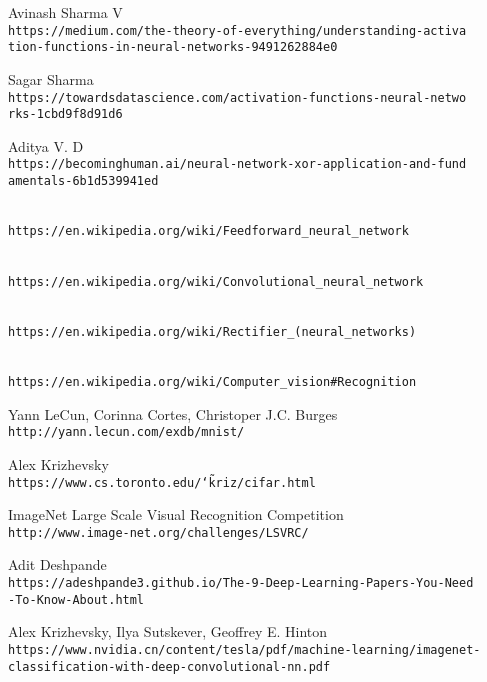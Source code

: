 \begin{thebibliography}{99}
Avinash Sharma V
\\\texttt{https://medium.com/the-theory-of-everything/understanding-activa\\tion-functions-in-neural-networks-9491262884e0}

Sagar Sharma
\\\texttt{https://towardsdatascience.com/activation-functions-neural-netwo\\rks-1cbd9f8d91d6}

Aditya V. D
\\\texttt{https://becominghuman.ai/neural-network-xor-application-and-fund\\amentals-6b1d539941ed}

\\\texttt{https://en.wikipedia.org/wiki/Feedforward\_neural\_network}

\\\texttt{https://en.wikipedia.org/wiki/Convolutional\_neural\_network}

\\\texttt{https://en.wikipedia.org/wiki/Rectifier\_(neural\_networks)}

\\\texttt{https://en.wikipedia.org/wiki/Computer\_vision\#Recognition}

Yann LeCun, Corinna Cortes, Christoper J.C. Burges
\\\texttt{http://yann.lecun.com/exdb/mnist/}

Alex Krizhevsky
\\\texttt{https://www.cs.toronto.edu/\char`\~kriz/cifar.html}

ImageNet Large Scale Visual Recognition Competition
\\\texttt{http://www.image-net.org/challenges/LSVRC/}

Adit Deshpande
\\\texttt{https://adeshpande3.github.io/The-9-Deep-Learning-Papers-You-Need\\-To-Know-About.html}

Alex Krizhevsky, Ilya Sutskever, Geoffrey E. Hinton
\\\texttt{https://www.nvidia.cn/content/tesla/pdf/machine-learning/imagenet-\\classification-with-deep-convolutional-nn.pdf}


\end{thebibliography}
